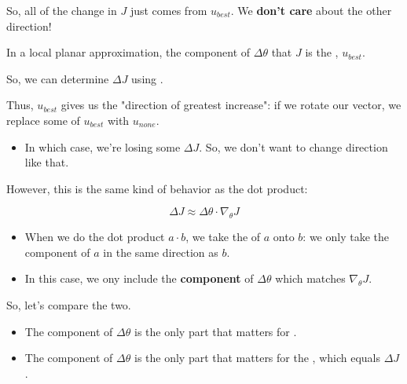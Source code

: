         So, all of the change in $J$ just comes from $u_{best}$. We \textbf{don't care} about the other direction!\\
        
        \begin{concept}
            In a local planar approximation, the  component of $\Delta \theta$ that  $J$ is the , $u_{best}$.
            
            So, we can determine $\Delta J$ using .

            \subsecdiv

            Thus, $u_{best}$ gives us the "direction of greatest increase": if we rotate our vector, we replace some of $u_{best}$ with $u_{none}$.
            
            \begin{itemize}
                \item In which case, we're losing some $\Delta J$. So, we don't want to change direction like that.
            \end{itemize}
        \end{concept}

        \subsecdiv

        However, this is the same kind of behavior as the dot product:

        \begin{equation}
            \Delta J \approx \Delta \theta \cdot \nabla_{\theta} J
        \end{equation}

        \begin{itemize}
            \item When we do the dot product $a \cdot b$, we take the  of $a$ onto $b$: we only take the component of $a$ in the same direction as $b$.
            \item In this case, we ony include the \textbf{component} of $\Delta \theta$ which matches $\nabla_{\theta} J$.
        \end{itemize}

        So, let's compare the two.

        \begin{itemize}
            \item The  component of $\Delta \theta$ is the only part that matters for .
            \item The  component of $\Delta \theta$ is the only part that matters for the , which equals $\Delta J$.
        \end{itemize}

